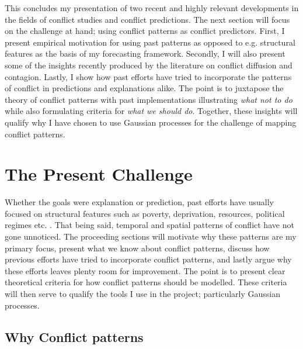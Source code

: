 \documentclass[a4paper]{article}
\begin{document}
This concludes my presentation of two recent and highly relevant developments in the fields of conflict studies and conflict predictions. The next section will focus on the challenge at hand; using conflict patterns as conflict predictors. First, I present empirical motivation for using past patterns as opposed to e.g. structural features as the basis of my forecasting framework. Secondly, I will also present some of the insights recently produced by the literature on conflict diffusion and contagion. Lastly, I show how past efforts have tried to incorporate the patterns of conflict in predictions and explanations alike. The point is to juxtapose the theory of conflict patterns with past implementations illustrating \emph{what not to do} while also formulating criteria for \emph{what we should do}. Together, these insights will qualify why I have chosen to use Gaussian processes for the challenge of mapping conflict patterns.\par

\section{The Present Challenge} %

Whether the goals were explanation or prediction, past efforts have usually focused on structural features such as poverty, deprivation, resources, political regimes etc. \citep[10]{chadefaux2017conflict}. That being said, temporal and spatial patterns of conflict have not gone unnoticed. The proceeding sections will motivate why these patterns are my primary focus, present what we know about conflict patterns, discuss how previous efforts have tried to incorporate conflict patterns, and lastly argue why these efforts leaves plenty room for improvement. The point is to present clear theoretical criteria for how conflict patterns should be modelled. These criteria will then serve to qualify the tools I use in the project; particularly Gaussian processes.\par 

\subsection{Why Conflict patterns}
\end{document}
